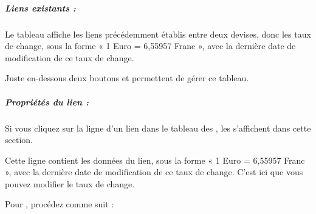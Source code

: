 
\subparagraph{Liens existants :\label{setup-resources-rate-existing}}

Le tableau affiche les liens précédemment établis entre deux devises, donc les taux de change, sous la forme « 1 Euro = 6,55957 Franc », avec la dernière date de modification de ce taux de change.

Juste en-dessous deux boutons  et  permettent de gérer ce tableau.






\subparagraph{Propriétés du lien :\label{setup-resources-rate-properties}}

Si vous cliquez sur la ligne d'un lien dans le tableau des , les  s'affichent dans cette section.

Cette ligne contient les données du lien, sous la forme « 1 Euro = 6,55957 Franc », avec la dernière date de modification de ce taux de change. C'est ici que vous pouvez modifier le taux de change.



Pour , procédez comme suit :

